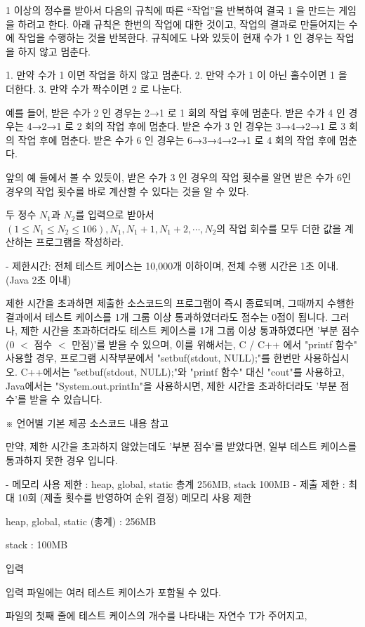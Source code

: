 \documentclass [12pt] {oblivoir}
\begin{document}
1 이상의 정수를 받아서 다음의 규칙에 따른 “작업”을 반복하여 결국 1 을 만드는 게임을 하려고 한다.
아래 규칙은 한번의 작업에 대한 것이고, 작업의 결과로 만들어지는 수에 작업을 수행하는 것을 반복한다. 규칙에도 나와 있듯이 현재 수가 1 인 경우는 작업을 하지 않고 멈춘다.

  1. 만약 수가 1 이면 작업을 하지 않고 멈춘다.
  2. 만약 수가 1 이 아닌 홀수이면 1 을 더한다.
  3. 만약 수가 짝수이면 2 로 나눈다.

예를 들어, 받은 수가 2 인 경우는 2→1 로 1 회의 작업 후에 멈춘다.
받은 수가 4 인 경우는 4→2→1 로 2 회의 작업 후에 멈춘다.
받은 수가 3 인 경우는 3→4→2→1 로 3 회의 작업 후에 멈춘다.
받은 수가 6 인 경우는 6→3→4→2→1 로 4 회의 작업 후에 멈춘다.

앞의 예 들에서 볼 수 있듯이, 받은 수가 3 인 경우의 작업 횟수를 알면 받은 수가 6인 경우의 작업 횟수를 바로 계산할 수 있다는 것을 알 수 있다.

두 정수 $N_{1}$과 $N_{2}$를 입력으로 받아서 $(1 \le N_{1} \le N_{2} \le 106), N_{1},N_{1}+1,N_{1}+2,\cdots,N_{2}$의 작업 회수를 모두 더한 값을 계산하는 프로그램을 작성하라.

- 제한시간: 전체 테스트 케이스는 10,000개 이하이며, 전체 수행 시간은 1초 이내. (Java 2초 이내)

제한 시간을 초과하면 제출한 소스코드의 프로그램이 즉시 종료되며,
그때까지 수행한 결과에서 테스트 케이스를 1개 그룹 이상 통과하였더라도 점수는 0점이 됩니다.
그러나, 제한 시간을 초과하더라도 테스트 케이스를 1개 그룹 이상 통과하였다면 '부분 점수(0 $<$ 점수 $<$ 만점)'를 받을 수 있으며,
이를 위해서는, C / C++ 에서 "printf 함수" 사용할 경우, 프로그램 시작부분에서 "setbuf(stdout, NULL);"를 한번만 사용하십시오.
C++에서는 "setbuf(stdout, NULL);"와 "printf 함수" 대신 "cout"를 사용하고, Java에서는 "System.out.printIn"을 사용하시면,
제한 시간을 초과하더라도 '부분 점수'를 받을 수 있습니다.

※ 언어별 기본 제공 소스코드 내용 참고

만약, 제한 시간을 초과하지 않았는데도 '부분 점수'를 받았다면, 일부 테스트 케이스를 통과하지 못한 경우 입니다.

- 메모리 사용 제한 : heap, global, static 총계 256MB, stack 100MB
- 제출 제한 : 최대 10회 (제출 횟수를 반영하여 순위 결정)
메모리 사용 제한

heap, global, static (총계) : 256MB

stack : 100MB

입력

입력 파일에는 여러 테스트 케이스가 포함될 수 있다.

파일의 첫째 줄에 테스트 케이스의 개수를 나타내는 자연수 T가 주어지고,
\end{document}
